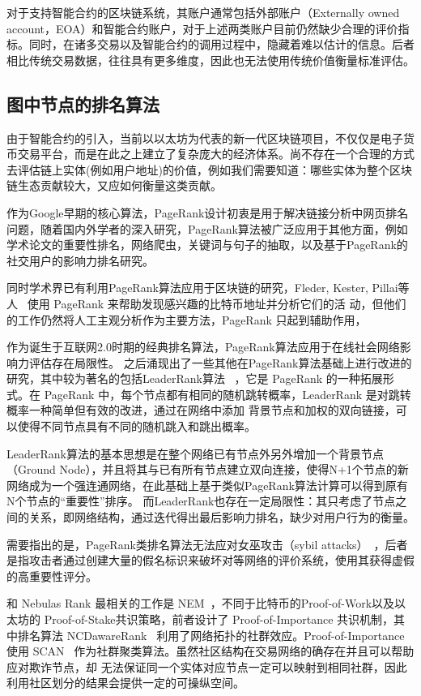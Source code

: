 对于支持智能合约的区块链系统，其账户通常包括外部账户（Externally owned account，EOA）和智能合约账户，对于上述两类账户目前仍然缺少合理的评价指标。同时，在诸多交易以及智能合约的调用过程中，隐藏着难以估计的信息。后者相比传统交易数据，往往具有更多维度，因此也无法使用传统价值衡量标准评估。





\subsection{图中节点的排名算法}
由于智能合约的引入，当前以以太坊为代表的新一代区块链项目，不仅仅是电子货币交易平台，而是在此之上建立了复杂庞大的经济体系。尚不存在一个合理的方式去评估链上实体(例如用户地址)的价值，例如我们需要知道：哪些实体为整个区块链生态贡献较大，又应如何衡量这类贡献。

作为Google早期的核心算法，PageRank设计初衷是用于解决链接分析中网页排名问题，随着国内外学者的深入研究，PageRank算法被广泛应用于其他方面，例如学术论文的重要性排名，网络爬虫，关键词与句子的抽取，以及基于PageRank的社交用户的影响力排名研究。

同时学术界已有利用PageRank算法应用于区块链的研究，Fleder, Kester, Pillai等人~\cite{Fleder2015} 使用 PageRank 来帮助发现感兴趣的比特币地址并分析它们的活 动，但他们的工作仍然将人工主观分析作为主要方法，PageRank 只起到辅助作用，

作为诞生于互联网2.0时期的经典排名算法，PageRank算法应用于在线社会网络影响力评估存在局限性。
之后涌现出了一些其他在PageRank算法基础上进行改进的研究，其中较为著名的包括LeaderRank算法 ~\cite{Li2014}，它是 PageRank 的一种拓展形式。在 PageRank 中，每个节点都有相同的随机跳转概率，LeaderRank 是对跳转概率一种简单但有效的改进，通过在网络中添加 背景节点和加权的双向链接，可以使得不同节点具有不同的随机跳入和跳出概率。

LeaderRank算法的基本思想是在整个网络已有节点外另外增加一个背景节点（Ground Node），并且将其与已有所有节点建立双向连接，使得N+1个节点的新网络成为一个强连通网络，在此基础上基于类似PageRank算法计算可以得到原有N个节点的“重要性”排序。
而LeaderRank也存在一定局限性：其只考虑了节点之间的关系，即网络结构，通过迭代得出最后影响力排名，缺少对用户行为的衡量。

需要指出的是，PageRank类排名算法无法应对女巫攻击（sybil attacks）~\cite{cheng2006manipulability}，后者是指攻击者通过创建大量的假名标识来破坏对等网络的评价系统，使用其获得虚假的高重要性评分。


和 Nebulas Rank 最相关的工作是 NEM~\cite{nem}，不同于比特币的Proof-of-Work以及以太坊的 Proof-of-Stake共识策略，前者设计了 Proof-of-Importance 共识机制，其中排名算法 NCDawareRank ~\cite{Nikolakopoulos2013}利用了网络拓扑的社群效应。Proof-of-Importance 使用 SCAN ~\cite{xu2007scan}\cite{shiokawa2015scan}\cite{chang2017mathsf}作为社群聚类算法。虽然社区结构在交易网络的确存在并且可以帮助应对欺诈节点，却 无法保证同一个实体对应节点一定可以映射到相同社群，因此利用社区划分的结果会提供一定的可操纵空间。

